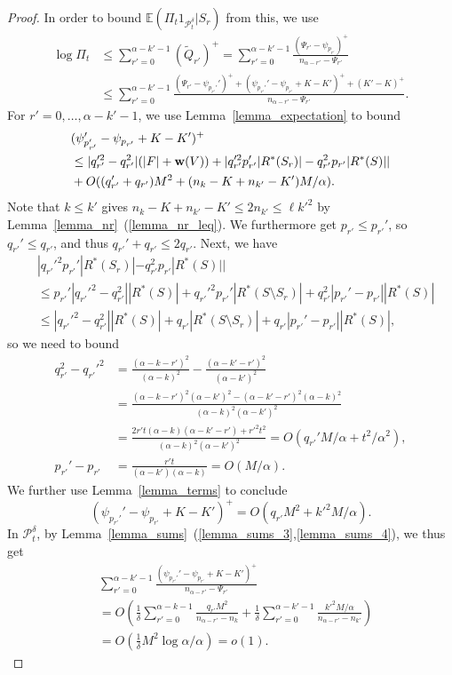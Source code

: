 \documentclass{article}
\theoremstyle{plain}
\theoremstyle{remark}
\theoremstyle{plain}
\numberwithin{equation}{section}
\renewcommand{\b}{{\bf{w}}}
\begin{document}
\begin{proof}
		In order to bound $\mathbb{E}(\Pi_t1_{\mathcal{P}_t^{\delta}}|S_r)$ from this, we use
		\begin{align}
			\log\Pi_t
			&\leq\sum_{r'=0}^{\alpha-k'-1}(\widetilde{Q}_{r'})^+=\sum_{r'=0}^{\alpha-k'-1}\frac{(\Psi_{r'}-\psi_{p_{r'}})^+}{n_{\alpha-r'}-\Psi_{r'}}
			\\&\leq\sum_{r'=0}^{\alpha-k'-1}\frac{(\Psi_{r'}-\psi_{p_{r'}'}')^++(\psi_{p_{r'}'}'-\psi_{p_{r'}}+K-K')^++(K'-K)^+}{n_{\alpha-r'}-\Psi_{r'}}.
		\end{align}
		For $r'=0,\ldots,\alpha-k'-1$, we use Lemma~\ref{lemma_expectation} to bound
		\begin{align}
			&(\psi_{p_{r'}'}'-\psi_{p_{r'}}+K-K')^+
			\\&\leq|q_{r'}'^2-q_{r'}^2|(|F|+\b(V))+|q_{r'}'^2p_{r'}'|R^*(S_r)|-q_{r'}^2p_{r'}|R^*(S)||
			\\&+O((q_{r'}'+q_{r'})M^2+(n_k-K+n_{k'}-K')M/\alpha).
		\end{align}
		Note that $k\leq k'$ gives $n_k-K+n_{k'}-K'\leq2n_{k'}\leq\ell k'^2$ by Lemma~\ref{lemma_nr}~(\ref{lemma_nr_leq}). We furthermore get $p_{r'}\leq p_{r'}'$, so $q_{r'}'\leq q_{r'}$, and thus $q_{r'}'+q_{r'}\leq2q_{r'}$. Next, we have
		\begin{align}
			&|q_{r'}'^2p_{r'}'|R^*(S_r)|-q_{r'}^2p_{r'}|R^*(S)||
			\\&\leq p_{r'}'|q_{r'}'^2-q_{r'}^2||R^*(S)|+q_{r'}'^2p_{r'}'|R^*(S\setminus S_r)|+q_{r'}^2|p_{r'}'-p_{r'}||R^*(S)|
			\\&\leq|q_{r'}'^2-q_{r'}^2||R^*(S)|+q_{r'}|R^*(S\setminus S_r)|+q_{r'}|p_{r'}'-p_{r'}||R^*(S)|,
		\end{align}
		so we need to bound
		\begin{align}
			q_{r'}^2-q_{r'}'^2
			&=\tfrac{(\alpha-k-r')^2}{(\alpha-k)^2}-\tfrac{(\alpha-k'-r')^2}{(\alpha-k')^2}
			\\&=\tfrac{(\alpha-k-r')^2(\alpha-k')^2-(\alpha-k'-r')^2(\alpha-k)^2}{(\alpha-k)^2(\alpha-k')^2}
			\\&=\tfrac{2r't(\alpha-k)(\alpha-k'-r')+r'^2t^2}{(\alpha-k)^2(\alpha-k')^2}=O(q_{r'}'M/\alpha+t^2/\alpha^2),
			\\p_{r'}'-p_{r'}
			&=\tfrac{r't}{(\alpha-k')(\alpha-k)}=O(M/\alpha).
		\end{align}
		We further use Lemma~\ref{lemma_terms} to conclude $$(\psi_{p_{r'}'}'-\psi_{p_{r'}}+K-K')^+=O(q_{r'}M^2+k'^2M/\alpha).$$ In $\mathcal{P}_t^{\delta}$, by Lemma~\ref{lemma_sums}~(\ref{lemma_sums_3},\ref{lemma_sums_4}), we thus get
		\begin{align}
			&\sum_{r'=0}^{\alpha-k'-1}\frac{(\psi_{p_{r'}'}'-\psi_{p_{r'}}+K-K')^+}{n_{\alpha-r'}-\Psi_{r'}}
			\\&=O\left(\tfrac{1}{\delta}\sum_{r'=0}^{\alpha-k-1}\frac{q_{r'}M^2}{n_{\alpha-r'}-n_k}+\tfrac{1}{\delta}\sum_{r'=0}^{\alpha-k'-1}\frac{k'^2M/\alpha}{n_{\alpha-r'}-n_{k'}}\right)
			\\&=O(\tfrac{1}{\delta}M^2\log\alpha/\alpha)=o(1).
		\end{align}
		

\end{proof}
\end{document}
